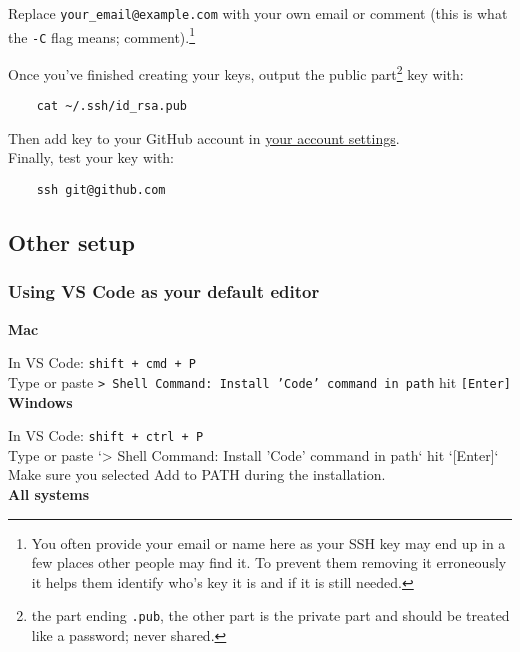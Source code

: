 Replace \texttt{your\_email@example.com} with your own email or comment (this is what the \texttt{-C} flag means; comment).\footnote{You often provide your email or name here as your SSH key may end up in a few places other people may find it. To prevent them removing it erroneously it helps them identify who's key it is and if it is still needed.}

Once you've finished creating your keys, output the public part\footnote{the part ending  \texttt{.pub}, the other part is the private part and should be treated like a password; never shared.} key with:

\begin{verbatim}
    cat ~/.ssh/id_rsa.pub
\end{verbatim}

Then add key to your GitHub account in \href{https://github.com/settings/ssh}{your account settings}.
\\

Finally, test your key with:

\begin{verbatim}
    ssh git@github.com
\end{verbatim}

\subsection{Other setup}

\subsubsection{Using VS Code as your default editor}

\textbf{Mac}

In VS Code: \texttt{shift + cmd + P}
\\

Type or paste \texttt{> Shell Command: Install 'Code' command in path} hit \texttt{[Enter]}
\\

\textbf{Windows}

In VS Code: \texttt{shift + ctrl + P}
\\

Type or paste `> Shell Command: Install 'Code' command in path` hit `[Enter]`
\\

Make sure you selected Add to PATH during the installation.
\\

\textbf{All systems}
\\

